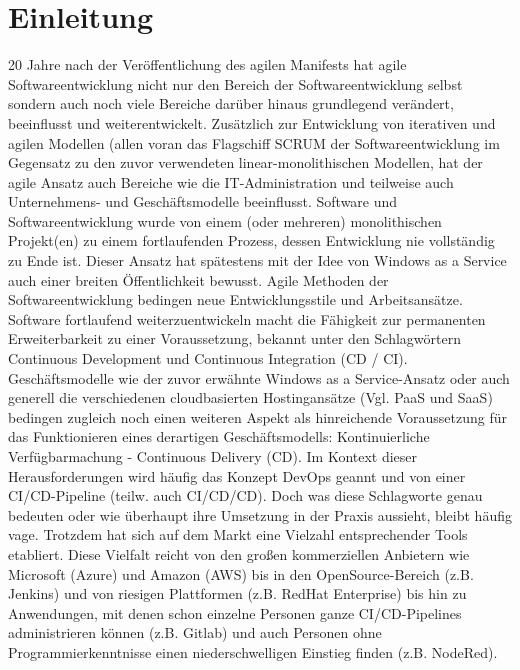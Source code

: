 \section{Einleitung}
\label{Einleitung}
20 Jahre nach der Veröffentlichung des agilen Manifests \cite{eckstein_20_2021} hat agile Softwareentwicklung nicht nur den Bereich der Softwareentwicklung selbst sondern auch noch viele Bereiche darüber hinaus grundlegend verändert, beeinflusst und weiterentwickelt. Zusätzlich zur Entwicklung von iterativen und agilen Modellen (allen voran das Flagschiff \gls{SCRUM} der Softwareentwicklung im Gegensatz zu den zuvor verwendeten linear-monolithischen Modellen, hat der agile Ansatz auch Bereiche wie die IT-Administration und teilweise auch Unternehmens- und Geschäftsmodelle beeinflusst.
Software und Softwareentwicklung wurde von einem (oder mehreren) monolithischen Projekt(en) zu einem fortlaufenden Prozess, dessen Entwicklung nie vollständig zu Ende ist. Dieser Ansatz hat spätestens mit der Idee von \grqq{}Windows as a Service\glqq{} \cite{jaimeo_kurzanleitung_2021} auch einer breiten Öffentlichkeit bewusst.\newline
Agile Methoden der Softwareentwicklung bedingen neue Entwicklungsstile und Arbeitsansätze. Software fortlaufend weiterzuentwickeln  macht die Fähigkeit zur permanenten Erweiterbarkeit zu einer Voraussetzung, bekannt unter den Schlagwörtern \glqq{} Continuous Development\grqq{} und \glqq{} Continuous Integration\grqq{}  (\acrshort{CD} / \acrshort{CI}). Geschäftsmodelle wie der zuvor erwähnte \glqq{}Windows as a Service\grqq{}-Ansatz oder auch generell die verschiedenen cloudbasierten Hostingansätze (Vgl. \acrshort{PaaS} und \acrshort{SaaS}) bedingen zugleich noch einen weiteren Aspekt als hinreichende Voraussetzung für das Funktionieren eines derartigen Geschäftsmodells: Kontinuierliche Verfügbarmachung - \glqq{}Continuous Delivery\grqq{} (\acrshort{CD}).\newline
Im Kontext dieser Herausforderungen wird häufig das Konzept \glqq{}\acrshort{DevOps}\grqq{} geannt und von einer \acrshort{CI}/\acrshort{CD}-Pipeline (teilw. auch \acrshort{CI}/\acrshort{CD}/\acrshort{CD}).
Doch was diese Schlagworte genau bedeuten oder wie überhaupt ihre Umsetzung in der Praxis aussieht, bleibt
häufig vage. Trotzdem hat sich auf dem Markt eine Vielzahl entsprechender Tools etabliert.
Diese Vielfalt reicht von den großen kommerziellen Anbietern wie Microsoft (Azure) und Amazon
(AWS) bis in den OpenSource-Bereich (z.B. Jenkins) und von riesigen Plattformen (z.B. RedHat Enterprise) bis hin zu Anwendungen, mit denen schon einzelne Personen ganze \acrshort{CI}/\acrshort{CD}-Pipelines administrieren können (z.B. Gitlab) und auch Personen ohne Programmierkenntnisse einen niederschwelligen Einstieg finden (z.B. NodeRed).